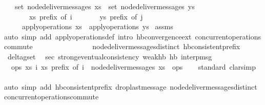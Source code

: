 \begin{isabellebody}
\ \ \ {\isachardoublequoteopen}set\ {\isacharparenleft}node{\isacharunderscore}deliver{\isacharunderscore}messages\ xs{\isacharparenright}\ {\isacharequal}\ set\ {\isacharparenleft}node{\isacharunderscore}deliver{\isacharunderscore}messages\ ys{\isacharparenright}{\isachardoublequoteclose}\isanewline
\ \ \ \ \ \ \ {\isachardoublequoteopen}xs\ prefix\ of\ i{\isachardoublequoteclose}\isanewline
\ \ \ \ \ \ \ {\isachardoublequoteopen}ys\ prefix\ of\ j{\isachardoublequoteclose}\isanewline
\ \ \ \ \ {\isachardoublequoteopen}apply{\isacharunderscore}operations\ xs\ {\isacharequal}\ apply{\isacharunderscore}operations\ ys{\isachardoublequoteclose}\isanewline
%
\isadelimproof
%
\endisadelimproof
%
\isatagproof
{}\isamarkupfalse%
\ assms\ \isamarkupfalse%
{\isacharparenleft}auto\ simp\ add{\isacharcolon}\ apply{\isacharunderscore}operations{\isacharunderscore}def\ intro{\isacharcolon}\ hb{\isachardot}convergence{\isacharunderscore}ext\ concurrent{\isacharunderscore}operations{\isacharunderscore}commute\isanewline
\ \ \ \ \ \ \ \ \ \ \ \ \ \ \ \ node{\isacharunderscore}deliver{\isacharunderscore}messages{\isacharunderscore}distinct\ hb{\isacharunderscore}consistent{\isacharunderscore}prefix{\isacharparenright}%
\endisatagproof
{\isafoldproof}%
%
\isadelimproof
\isanewline
%
\endisadelimproof
\isanewline
{}\isamarkupfalse%
\ delta{\isacharunderscore}gset\ \isanewline
\isanewline
{}\isamarkupfalse%
\ sec{\isacharcolon}\ strong{\isacharunderscore}eventual{\isacharunderscore}consistency\ weak{\isacharunderscore}hb\ hb\ interp{\isacharunderscore}msg\isanewline
\ \ {\isachardoublequoteopen}{\isasymlambda}ops{\isachardot}\ {\isasymexists}xs\ i{\isachardot}\ xs\ prefix\ of\ i\ {\isasymand}\ node{\isacharunderscore}deliver{\isacharunderscore}messages\ xs\ {\isacharequal}\ ops{\isachardoublequoteclose}\ {\isachardoublequoteopen}{\isacharbraceleft}{\isacharbraceright}{\isachardoublequoteclose}\isanewline
%
\isadelimproof
\ \ %
\endisadelimproof
%
\isatagproof
{}\isamarkupfalse%
{\isacharparenleft}standard{\isacharsemicolon}\ clarsimp{\isacharparenright}\isanewline
\ \ \ \ \ \ \isamarkupfalse%
{\isacharparenleft}auto\ simp\ add{\isacharcolon}\ hb{\isacharunderscore}consistent{\isacharunderscore}prefix\ drop{\isacharunderscore}last{\isacharunderscore}message\ node{\isacharunderscore}deliver{\isacharunderscore}messages{\isacharunderscore}distinct\ concurrent{\isacharunderscore}operations{\isacharunderscore}commute{\isacharparenright}\isanewline

\end{isabellebody}
